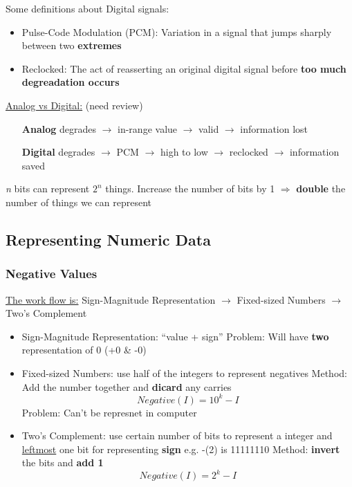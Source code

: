 \documentclass[12pt]{article}
\begin{document}
Some definitions about Digital signals:
\begin{itemize}
    \item Pulse-Code Modulation (PCM): Variation in a signal that jumps sharply between two \textbf{extremes}
    \item Reclocked: The act of reasserting an original digital signal before \textbf{too much degreadation occurs}
\end{itemize}

\underline{Analog vs Digital:} (need review)
\begin{itemize}
    \item[\textbf{Analog}] degrades $\rightarrow$ in-range value $\rightarrow$ valid $\rightarrow$ information lost
    \item[\textbf{Digital}] degrades $\rightarrow$ PCM $\rightarrow$ high to low $\rightarrow$ reclocked $\rightarrow$ information saved  
\end{itemize}

\emph{n} bits can represent $2^{n}$ things.\newline
Increase the number of bits by 1 $\Rightarrow$ \textbf{double} the number of things we can represent

\subsection{Representing Numeric Data}
\subsubsection{Negative Values}
\underline{The work flow is:}\newline
Sign-Magnitude Representation $\rightarrow$ Fixed-sized Numbers $\rightarrow$ Two's Complement

\begin{itemize}
    \item Sign-Magnitude Representation: ``value + sign'' \newline
    Problem: Will have \textbf{two} representation of 0 (+0 \& -0)
    \item Fixed-sized Numbers: use half of the integers to represent negatives \newline
    Method: Add the number together and \textbf{dicard} any carries
    \begin{equation}
        Negative(I) = 10^k - I
    \end{equation}
    Problem: Can't be represnet in computer
    \item Two's Complement: use certain number of bits to represent a integer and \underline{leftmost} one bit for representing \textbf{sign}
    e.g. -(2) is 11111110 \newline
    Method: \textbf{invert} the bits and \textbf{add 1}
    \begin{equation}
        Negative(I) = 2^k - I
    \end{equation}
\end{itemize}
\end{document}
